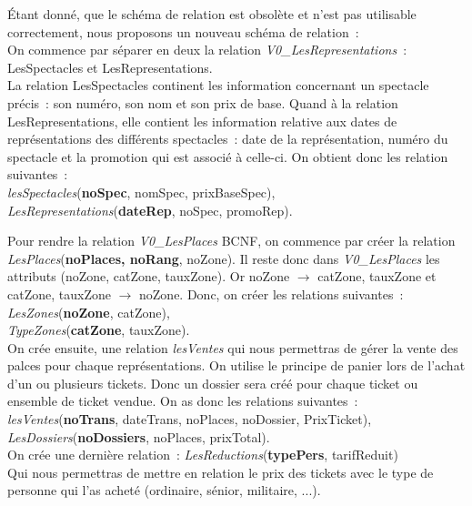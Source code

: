 \documentclass[a4paper, 10pt, twoside]{article}
\begin{document}
  Étant donné, que le schéma de relation est obsolète et n'est pas utilisable correctement, nous proposons un nouveau schéma de relation~:\\
  On commence par séparer en deux la relation \emph{V0\_LesRepresentations}~: LesSpectacles et LesRepresentations.\\
  La relation LesSpectacles continent les information concernant un spectacle précis~: son numéro, son nom et son prix de base.
  Quand à la relation LesRepresentations, elle contient les information relative aux dates de représentations des différents spectacles~: date de la représentation,
  numéro du spectacle et la promotion qui est associé à celle-ci.
  On obtient donc les relation suivantes~:\\
  \emph{lesSpectacles}(\textbf{noSpec}, nomSpec, prixBaseSpec),\\
  \emph{LesRepresentations}(\textbf{dateRep}, noSpec, promoRep).\\

\newpage
\thispagestyle{empty}

  \noindent Pour rendre la relation \emph{V0\_LesPlaces} BCNF, on commence par créer la relation
  \emph{LesPlaces}(\textbf{noPlaces, noRang}, noZone). Il reste donc dans \emph{V0\_LesPlaces} les attributs (noZone, catZone, tauxZone).
  Or noZone $\rightarrow$ catZone, tauxZone et catZone, tauxZone $\rightarrow$ noZone. Donc, on créer les relations suivantes~:\\
  \emph{LesZones}(\textbf{noZone}, catZone),\\
  \emph{TypeZones}(\textbf{catZone}, tauxZone).\\

  \noindent On crée ensuite, une relation \emph{lesVentes} qui nous permettras de gérer la vente des palces pour chaque représentations.
  On utilise le principe de panier lors de l'achat d'un ou plusieurs tickets. Donc un dossier sera créé pour chaque ticket ou ensemble de ticket vendue.
  On as donc les relations suivantes~:\\
  \emph{lesVentes}(\textbf{noTrans}, dateTrans, noPlaces, noDossier, PrixTicket),\\
  \emph{LesDossiers}(\textbf{noDossiers}, noPlaces, prixTotal).\\

  \noindent On crée une dernière relation~:
  \emph{LesReductions}(\textbf{typePers}, tarifReduit)\\
  Qui nous permettras de mettre en relation le prix des tickets avec le type de personne qui l'as acheté (ordinaire,
  sénior, militaire, ...).
\end{document}
